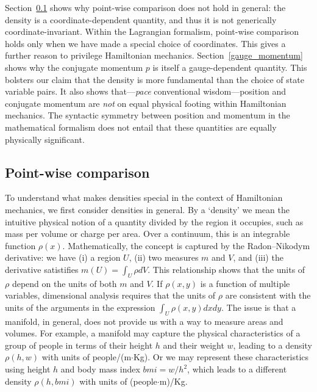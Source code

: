 \documentclass[12pt, english, twoside]{article} %
\begin{document}
Section~\ref{dependence} shows why point-wise comparison does not hold in general: the density is a coordinate-dependent quantity, and thus it is not generically coordinate-invariant. Within the Lagrangian formalism, point-wise comparison holds only when we have made a special choice of coordinates. This gives a further reason to privilege Hamiltonian mechanics. Section~\ref{gauge_momentum} shows why the conjugate momentum $p$ is itself a gauge-dependent quantity. This bolsters our claim that the density is more fundamental than the choice of state variable pairs. It also shows that---\textit{pace} conventional wisdom---position and conjugate momentum are \textit{not} on equal physical footing within Hamiltonian mechanics. The syntactic symmetry between position and momentum in the mathematical formalism does not entail that these quantities are equally physically significant. 


\subsection{Point-wise comparison}
\label{dependence}

To understand what makes densities special in the context of Hamiltonian mechanics, we first consider densities in general. By a `density' we mean the intuitive physical notion of a quantity divided by the region it occupies, such as mass per volume or charge per area. Over a continuum, this is an integrable function $\rho(x)$. Mathematically, the concept is captured by the Radon–Nikodym derivative: we have (i) a region $U$, (ii) two measures $m$ and $V$, and (iii) the derivative satistifies $m(U) = \int_U \rho dV$. This relationship shows that the units of $\rho$ depend on the units of both $m$ and $V$. If $\rho(x, y)$ is a function of multiple variables, dimensional analysis requires that the units of $\rho$ are consistent with the units of the arguments in the expression $\int_U \rho(x, y) dx dy$. The issue is that a manifold, in general, does not provide us with a way to measure areas and volumes. For example, a manifold may capture the physical characteristics of a group of people in terms of their height $h$ and their weight $w$, leading to a density $\rho(h,w)$ with units of people/(m$\cdot$Kg). Or we may represent these characteristics using height $h$ and body mass index $bmi = w / h^2$, which leads to a different density $\rho(h,bmi)$ with units of (people$\cdot$m)/Kg.
\end{document}
